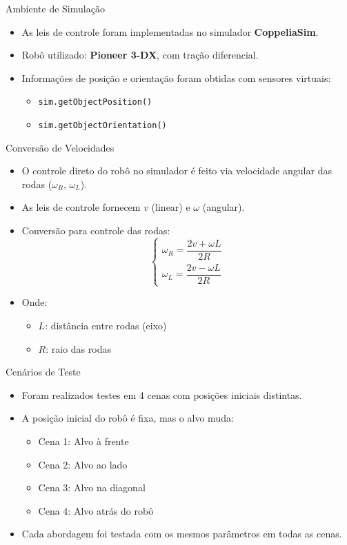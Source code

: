 \documentclass{beamer}
\begin{document}
\begin{frame}{Ambiente de Simulação}
  \begin{itemize}
    \item As leis de controle foram implementadas no simulador \textbf{CoppeliaSim}.
    \item Robô utilizado: \textbf{Pioneer 3-DX}, com tração diferencial.
    \item Informações de posição e orientação foram obtidas com sensores virtuais:
    \begin{itemize}
      \item \texttt{sim.getObjectPosition()}
      \item \texttt{sim.getObjectOrientation()}
    \end{itemize}
  \end{itemize}
\end{frame}

\begin{frame}{Conversão de Velocidades}
  \begin{itemize}
    \item O controle direto do robô no simulador é feito via velocidade angular das rodas ($\omega_R$, $\omega_L$).
    \item As leis de controle fornecem $v$ (linear) e $\omega$ (angular).
    \item Conversão para controle das rodas:
    \[
    \begin{cases}
    \omega_R = \dfrac{2v + \omega L}{2R} \\
    \omega_L = \dfrac{2v - \omega L}{2R}
    \end{cases}
    \]
    \item Onde:
    \begin{itemize}
      \item $L$: distância entre rodas (eixo)
      \item $R$: raio das rodas
    \end{itemize}
  \end{itemize}
\end{frame}

\begin{frame}{Cenários de Teste}
  \begin{itemize}
    \item Foram realizados testes em 4 cenas com posições iniciais distintas.
    \item A posição inicial do robô é fixa, mas o alvo muda:
    \begin{itemize}
      \item Cena 1: Alvo à frente
      \item Cena 2: Alvo ao lado
      \item Cena 3: Alvo na diagonal
      \item Cena 4: Alvo atrás do robô
    \end{itemize}
    \item Cada abordagem foi testada com os mesmos parâmetros em todas as cenas.
  \end{itemize}
\end{frame}
\end{document}
